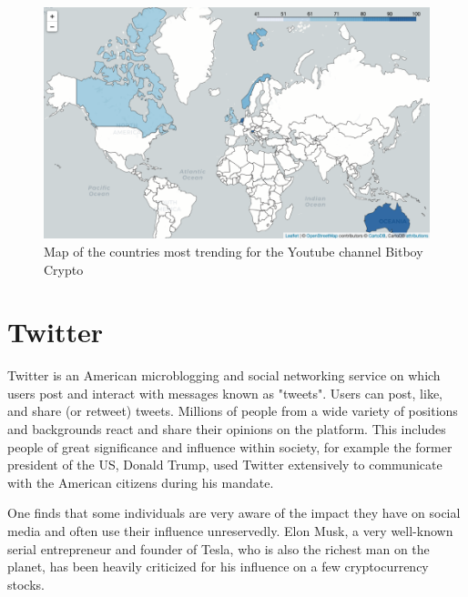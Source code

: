 \documentclass[twoside]{report}
\begin{document}
\begin{spacing}{1}
\begin{figure}[!htbp]
    \centering
    \includegraphics[scale = 0.4]{Images/countries_map_2.png}
    \caption{Map of the countries most trending for the Youtube channel Bitboy Crypto}
    \label{countries_map_2}
\end{figure}


\section{Twitter}
Twitter is an American microblogging and social networking service on which users post and interact with messages known as "tweets". Users can post, like, and share (or retweet) tweets. Millions of people from a wide variety of positions and backgrounds react and share their opinions on the platform. This includes people of great significance  and influence within society, for example the former president of the US, Donald Trump, used Twitter extensively to communicate with the American citizens during his mandate.

One finds that some individuals are very aware of the impact they have on social media and often use their influence unreservedly. Elon Musk, a very well-known serial entrepreneur and founder of Tesla, who is also the richest man on the planet, has been heavily criticized for his influence on a few cryptocurrency stocks. %


\end{spacing}
\end{document}
